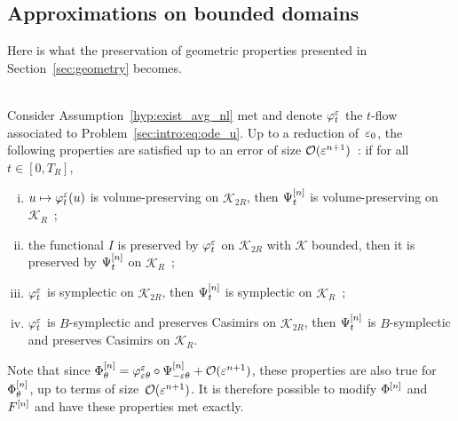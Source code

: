 \subsection{Approximations on bounded domains}
\label{sec:approx}


Here is what the preservation of geometric properties presented in
Section~\ref{sec:geometry} becomes. 

\begin{theorem}
\hspace*{1em} \\
  Consider Assumption~\ref{hyp:exist_avg_nl} met and denote
  $\varphi^\varepsilon _t$ the $t$-flow associated to
  Problem~\eqref{sec:intro:eq:ode_u}. Up to a reduction of~$\varepsilon_0$, the
  following properties are satisfied up to an error of size
  $\mathcal{O}(\varepsilon^{n+1})$~: if for all $t \in [0, T_R]$, 
  \begin{enumerate}[(i)]
    \item $u \mapsto \varphi^\varepsilon _t(u)$ is volume-preserving on
    $\mathcal{K}_{2R}$, then $\Psi^{[n]} _t$ is volume-preserving on
    $\mathcal{K}_R$~;
    \item the functional $I$ is preserved by $\varphi^\varepsilon _t$ on
    $\mathcal{K}_{2R}$ with $\mathcal{K}$ bounded, then it is preserved
    by $\Psi^{[n]} _t$ on $\mathcal{K}_R$~; 
    \item $\varphi^\varepsilon _t$ is symplectic on $\mathcal{K}_{2R}$, then
    $\Psi^{[n]} _t$ is symplectic on $\mathcal{K}_R$~;
    \item $\varphi^\varepsilon _t$ is $B$-symplectic and preserves Casimirs on
    $\mathcal{K}_{2R}$, then $\Psi^{[n]} _t$ is $B$-symplectic and
    preserves Casimirs on $\mathcal{K}_R$.
  \end{enumerate}
  Note that since $\Phi^{[n]} _\theta = \varphi^\varepsilon _{\varepsilon\theta} \circ
  \Psi^{[n]} _{-\varepsilon\theta} + \mathcal{O}(\varepsilon^{n+1})$, these properties are
  also true for $\Phi^{[n]} _\theta$, up to terms of
  size~$\mathcal{O}(\varepsilon^{n+1})$. It is therefore possible to modify $\Phi^{[n]}$ and $F^{[n]}$ and have these properties met exactly.
\end{theorem}

